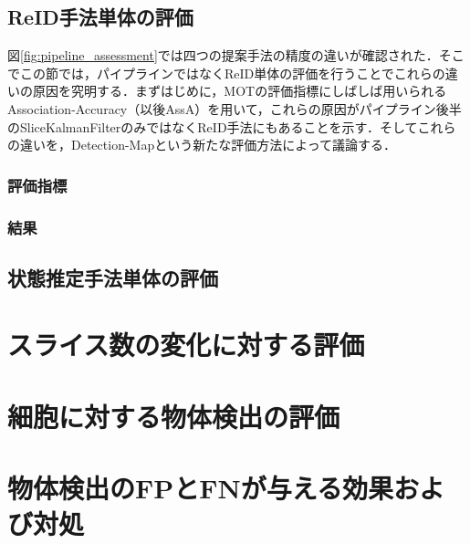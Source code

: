     \subsection{ReID手法単体の評価}
    \label{subsec:evaluate_reidentification}

    図\ref{fig:pipeline_assessment}では四つの提案手法の精度の違いが確認された．そこでこの節では，パイプラインではなくReID単体の評価を行うことでこれらの違いの原因を究明する．まずはじめに，MOTの評価指標にしばしば用いられるAssociation-Accuracy（以後AssA）を用いて，これらの原因がパイプライン後半のSliceKalmanFilterのみではなくReID手法にもあることを示す．そしてこれらの違いを，Detection-Mapという新たな評価方法によって議論する．

        \subsubsection{評価指標}
        


        \subsubsection{結果}

    \subsection{状態推定手法単体の評価}
    \label{subsec:evaluate_estimation}

\section{スライス数の変化に対する評価}
\label{sec:number_of_slice}

\section{細胞に対する物体検出の評価}
\label{sec:cell_detection}

\section{物体検出のFPとFNが与える効果および対処}
\label{sec:covering_detection}
